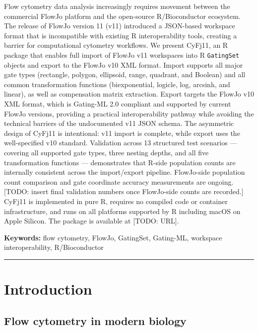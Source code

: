 \documentclass[
]{article}
\begin{document}
Flow cytometry data analysis increasingly requires movement between the
commercial FlowJo platform and the open-source R/Bioconductor ecosystem.
The release of FlowJo version 11 (v11) introduced a JSON-based workspace
format that is incompatible with existing R interoperability tools,
creating a barrier for computational cytometry workflows. We present
CyFj11, an R package that enables full import of FlowJo v11 workspaces
into R \texttt{GatingSet} objects and export to the FlowJo v10 XML
format. Import supports all major gate types (rectangle, polygon,
ellipsoid, range, quadrant, and Boolean) and all common transformation
functions (biexponential, logicle, log, arcsinh, and linear), as well as
compensation matrix extraction. Export targets the FlowJo v10 XML
format, which is Gating-ML 2.0 compliant and supported by current FlowJo
versions, providing a practical interoperability pathway while avoiding
the technical barriers of the undocumented v11 JSON schema. The
asymmetric design of CyFj11 is intentional: v11 import is complete,
while export uses the well-specified v10 standard.
\textcolor{pending}{Validation across 13 structured test scenarios — covering all supported gate types, three nesting depths, and all five transformation functions — demonstrates that R-side population counts are internally consistent across the import/export pipeline. FlowJo-side population count comparison and gate coordinate accuracy measurements are ongoing. [TODO: insert final validation numbers once FlowJo-side counts are recorded.]}
CyFj11 is implemented in pure R, requires no compiled code or container
infrastructure, and runs on all platforms supported by R including macOS
on Apple Silicon. The package is available at
\textcolor{pending}{[TODO: URL]}.

\textbf{Keywords:} flow cytometry, FlowJo, GatingSet, Gating-ML,
workspace interoperability, R/Bioconductor

\begin{center}\rule{0.5\linewidth}{0.5pt}\end{center}

\section{Introduction}\label{introduction}

\subsection{Flow cytometry in modern
biology}\label{flow-cytometry-in-modern-biology}
\end{document}

